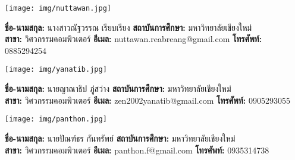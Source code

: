 \documentclass[final]{cpecmu}
\begin{document}
  \begin{biosketch}
    \begin{center}
      \texttt{[image: img/nuttawan.jpg]}
    \end{center}
    \textbf{ชื่อ-นามสกุล:} นางสาวณัฐวรรณ เรียบเรียง \quad
    \textbf{สถาบันการศึกษา:} มหาวิทยาลัยเชียงใหม่ \\
    \textbf{สาขา:} วิศวกรรมคอมพิวเตอร์ \quad
    \textbf{อีเมล:} nuttawan.reabreang@gmail.com \quad
    \textbf{โทรศัพท์:} 0885294254 \\

    \begin{center}
      \texttt{[image: img/yanatib.jpg]}
    \end{center}
    \textbf{ชื่อ-นามสกุล:} นายญาณาธิป ภู่สว่าง \quad
    \textbf{สถาบันการศึกษา:} มหาวิทยาลัยเชียงใหม่ \\
    \textbf{สาขา:} วิศวกรรมคอมพิวเตอร์ \quad
    \textbf{อีเมล:} zen2002yanatib@gmail.com \quad
    \textbf{โทรศัพท์:} 0905293055 \\

    \begin{center}
      \texttt{[image: img/panthon.jpg]}
    \end{center}
    \textbf{ชื่อ-นามสกุล:} นายปัณฑ์ธร กันทรัพย์ \quad
    \textbf{สถาบันการศึกษา:} มหาวิทยาลัยเชียงใหม่ \\
    \textbf{สาขา:} วิศวกรรมคอมพิวเตอร์ \quad
    \textbf{อีเมล:} panthon.f@gmail.com \quad
    \textbf{โทรศัพท์:} 0935314738 \\
  \end{biosketch}
\fi %
\end{document}
